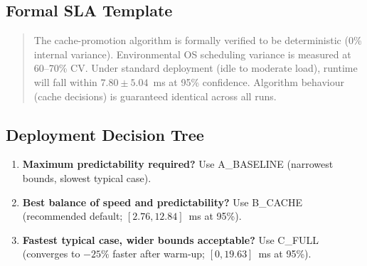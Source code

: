 \subsection{Formal SLA Template}

\begin{quotation}
The cache-promotion algorithm is formally verified to be deterministic (0\% internal
variance). Environmental OS scheduling variance is measured at 60--70\% CV. Under
standard deployment (idle to moderate load), runtime will fall within
$7.80 \pm 5.04$~ms at 95\% confidence. Algorithm behaviour (cache decisions) is
guaranteed identical across all runs.
\end{quotation}

\subsection{Deployment Decision Tree}

\begin{enumerate}
  \item \textbf{Maximum predictability required?} Use A\_BASELINE (narrowest bounds,
        slowest typical case).
  \item \textbf{Best balance of speed and predictability?} Use B\_CACHE (recommended
        default; $[2.76, 12.84]$~ms at 95\%).
  \item \textbf{Fastest typical case, wider bounds acceptable?} Use C\_FULL (converges
        to $-25\%$ faster after warm-up; $[0, 19.63]$~ms at 95\%).
\end{enumerate}

